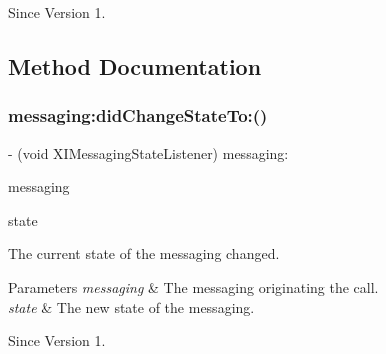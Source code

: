 \begin{DoxySince}{Since}
Version 1. 
\end{DoxySince}


\subsection{Method Documentation}
\hypertarget{protocol_x_i_messaging_state_listener_01-p_a9eb7b05e86af332ad9ce6b78f6ffdc46}{}\label{protocol_x_i_messaging_state_listener_01-p_a9eb7b05e86af332ad9ce6b78f6ffdc46} 
\subsubsection{\texorpdfstring{messaging\+:did\+Change\+State\+To\+:()}{messaging:didChangeStateTo:()}}
{\footnotesize\ttfamily -\/ (void X\+I\+Messaging\+State\+Listener) messaging\+: \begin{DoxyParamCaption}\item[{(id$<$ X\+I\+Messaging $>$)}]{messaging }\item[{didChangeStateTo:(X\+I\+Messaging\+State)}]{state }\end{DoxyParamCaption}}



The current state of the messaging changed. 


\begin{DoxyParams}{Parameters}
{\em messaging} & The messaging originating the call. \\
\hline
{\em state} & The new state of the messaging. \\
\hline
\end{DoxyParams}
\begin{DoxySince}{Since}
Version 1. 
\end{DoxySince}
\hypertarget{protocol_x_i_messaging_state_listener_01-p_af095a64858599a26d65e266346acbbae}{}\label{protocol_x_i_messaging_state_listener_01-p_af095a64858599a26d65e266346acbbae} 
